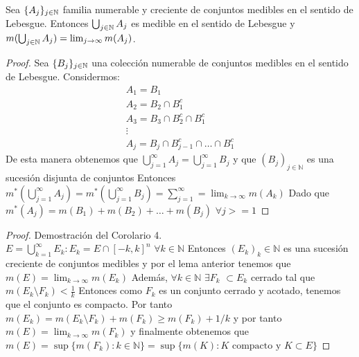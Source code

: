 \begin{lema}
    Sea $\{A_j\}_{j \in \mathbb{N}}$ familia numerable y creciente de conjuntos medibles en el sentido de Lebesgue. Entonces $\bigcup_{j \in \mathbb{N}} A_j$ es medible en el sentido de Lebesgue y $m(\bigcup_{j \in \mathbb{N}} A_j) = \lim_{j \to \infty} m(A_j)$.
\end{lema}


\begin{proof}
    Sea $\{B_j\}_{j \in \mathbb{N}}$ una colección numerable de conjuntos medibles en el sentido de Lebesgue. Considermos:
    \[\begin{matrix}
        A_1 = B_1\\
        A_2 = B_2 \cap B_1^c\\
        A_3 = B_3 \cap B_2^c \cap B_1^c\\
        \vdots\\
        A_j = B_j \cap B_{j-1}^c \cap \ldots \cap B_1^c
    \end{matrix}\]
    De esta manera obtenemos que $\bigcup_{j = 1}^{\infty} A_j = \bigcup_{j = 1}^{\infty} B_j$ y que $(B_j)_{j \in \mathbb{N}}$ es una sucesión disjunta de conjuntos
    Entonces $m^*(\bigcup_{j = 1}^{\infty}A_j) = m^*(\bigcup_{j = 1}^{\infty}B_j) = \sum_{j = 1}^{\infty} = \lim_{k \to \infty} m(A_k)$
    Dado que $m^*(A_j) = m(B_1) + m(B_2) + \ldots + m(B_j)$ $ \forall j >= 1$ 
\end{proof}

\begin{proof}
    Demostración del Corolario 4.\\
    $E = \bigcup_{k = 1}^{\infty} E_k : E_k = E \cap [-k, k]^n$ $\forall k \in \mathbb{N}$
    Entonces $(E_k)_k \in \mathbb{N}$ es una sucesión creciente de conjuntos medibles y por el lema anterior tenemos que $m(E) = \lim_{k \to \infty} m(E_k)$
    Además, $\forall k \in \mathbb{N}$ $\exists F_k$ $ \subset E_k$ cerrado tal que $m(E_k \setminus F_k) < \frac{1}{k}$
    Entonces como $F_k$ es un conjunto cerrado y acotado, tenemos que el conjunto es compacto. 
    Por tanto $m(E_k) = m(E_k \setminus F_k) + m(F_k) \geq m(F_k) + 1/k$ y por tanto $m(E) = \lim_{k \to \infty} m(F_k)$ y finalmente obtenemos que
    $m(E) = \sup\{m(F_k) : k \in \mathbb{N} \} = \sup\{m(K) : K \text{ compacto y } K \subset E\}$
\end{proof}


